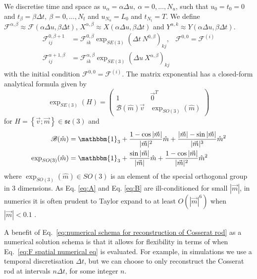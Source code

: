 \documentclass[withindex,glossary,techreport]{cam-thesis}
\begin{document}
\begin{appendices}
We discretise time and space as $u_{\alpha}=\alpha\Delta u,\ \alpha=0,\dots,N_{u}$, such that $u_{0}=t_{0}=0$ and $t_{\beta}=\beta\Delta t,\ \beta=0,\dots,N_{t}$
and $u_{N_{u}}=L_{0}$ and $t_{N_{t}}=T$. We define $\mathcal{F}^{\alpha,\beta}\approx\mathcal{F}(\alpha\Delta u,\beta\Delta t)$,
$X^{\alpha,\beta}\approx X(\alpha\Delta u,\beta\Delta t)$ and $Y^{\alpha,k}\approx Y(\alpha\Delta u,\beta\Delta t)$.
\begin{subequations} \label{eq:numerical schema for reconstruction of Cosserat rod}
\begin{align}
\mathcal{F}_{ij}^{0, \beta+1} & =\mathcal{F}_{ik}^{0, \beta} \exp_{SE(3)} \left(\Delta t\ N^{0, \beta}\right)_{kj}, & \mathcal{F}^{0,0}=\mathcal{F}^{(i)}\\
\mathcal{F}_{ij}^{\alpha+1, \beta} & =\mathcal{F}_{ik}^{\alpha, \beta}\exp_{SE(3)}  \left(\Delta u\ X^{\alpha,\beta}\right)_{kj} \label{eq:F spatial numerical eq}
\end{align}
\end{subequations}
with the initial condition $\mathcal{F}^{0,0}=\mathcal{F}^{(i)}$.
The matrix exponential has a closed-form analytical formula given
by
\begin{equation}
\exp_{SE(3)}  (H)=\left(\begin{array}{cc}
1 & \vec{0}^{T}\\
\mathscr{B}(\hat{m}) \vec{v} & \exp_{SO(3)}(\hat{m})
\end{array}\right)
\end{equation}
for $H=\left\{ \vec{v};\vec{m}\right\} \in\mathfrak{se}(3)$ and
\begin{subequations} 
\begin{align}
\mathscr{B}(\hat{m}) & =\mathbbm{1}_{3}+\frac{1-\cos|\vec{m}|}{|\vec{m}|^{2}}\hat{m}+\frac{|\vec{m}|-\sin|\vec{m}|}{|\vec{m}|^{3}}\hat{m}^{2}\label{eq:A}\\
\exp_{SO(3)} (\hat{m}) & =\mathbbm{1}_{3}+\frac{\sin|\vec{m}|}{|\vec{m}|}\hat{m}+\frac{1-\cos|\vec{m}|}{|\vec{m}|^{2}}\hat{m}^{2}\label{eq:B}
\end{align}
\end{subequations}
where $\exp_{SO(3)} (\hat{m}) \in SO(3)$ is an element of the special orthogonal
group in 3 dimensions. As Eq. \ref{eq:A} and Eq. \ref{eq:B} are
ill-conditioned for small $|\vec{m}|$, in numerics it is often prudent
to Taylor expand to at least $O(|\vec{m}|^6)$ when $|\vec{m}| < 0.1$ \citep{giusteriSimulationViscoelasticCosserat2021}.

A benefit of Eq.~\ref{eq:numerical schema for reconstruction of Cosserat rod} as a numerical solution schema is that it allows for flexibility in terms of when Eq.~\ref{eq:F spatial numerical eq} is evaluated. For example, in simulations we use a temporal discretisation $\Delta t$, but we can choose to only reconstruct the Cosserat rod at intervals $n \Delta t$, for some integer $n$.






\end{appendices}
\end{document}
